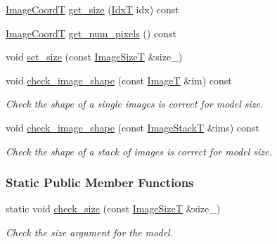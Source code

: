\begin{DoxyCompactItemize}
\item 
\hyperlink{classmappel_1_1ImageFormat2DBase_a45e9234d63c357f34ca56c72c12b9e9c}{Image\+CoordT} \hyperlink{classmappel_1_1ImageFormat2DBase_a07ad97af7e697240ee359ae6a4821a2f}{get\+\_\+size} (\hyperlink{namespacemappel_ab17ec0f30b61ece292439d7ece81d3a8}{IdxT} idx) const 
\item 
\hyperlink{classmappel_1_1ImageFormat2DBase_a45e9234d63c357f34ca56c72c12b9e9c}{Image\+CoordT} \hyperlink{classmappel_1_1ImageFormat2DBase_a4f9e0d332462ff53678c03700666a564}{get\+\_\+num\+\_\+pixels} () const 
\item 
void \hyperlink{classmappel_1_1ImageFormat2DBase_afb0cba98e353625641646506aeb80372}{set\+\_\+size} (const \hyperlink{classmappel_1_1ImageFormat2DBase_a49cccf61eb2a768a202634d27fcd81d5}{Image\+SizeT} \&size\+\_\+)
\item 
void \hyperlink{classmappel_1_1ImageFormat2DBase_aa5f3936c1c0b250fa1df17d53161a991}{check\+\_\+image\+\_\+shape} (const \hyperlink{classmappel_1_1ImageFormat2DBase_a667ea5016648958e507e7db8eaa041b0}{ImageT} \&im) const 
\begin{DoxyCompactList}\small\item\em Check the shape of a single images is correct for model size. \end{DoxyCompactList}\item 
void \hyperlink{classmappel_1_1ImageFormat2DBase_ab40faca8bf94a6e59765da5c3185c19b}{check\+\_\+image\+\_\+shape} (const \hyperlink{classmappel_1_1ImageFormat2DBase_a8f0276e94ff242fa4740a718642f5e14}{Image\+StackT} \&ims) const 
\begin{DoxyCompactList}\small\item\em Check the shape of a stack of images is correct for model size. \end{DoxyCompactList}\end{DoxyCompactItemize}
\subsubsection*{Static Public Member Functions}
\begin{DoxyCompactItemize}
\item 
static void \hyperlink{classmappel_1_1ImageFormat2DBase_a9c90f6a165348629be4bcf956e3010f3}{check\+\_\+size} (const \hyperlink{classmappel_1_1ImageFormat2DBase_a49cccf61eb2a768a202634d27fcd81d5}{Image\+SizeT} \&size\+\_\+)
\begin{DoxyCompactList}\small\item\em Check the size argument for the model. \end{DoxyCompactList}\end{DoxyCompactItemize}
